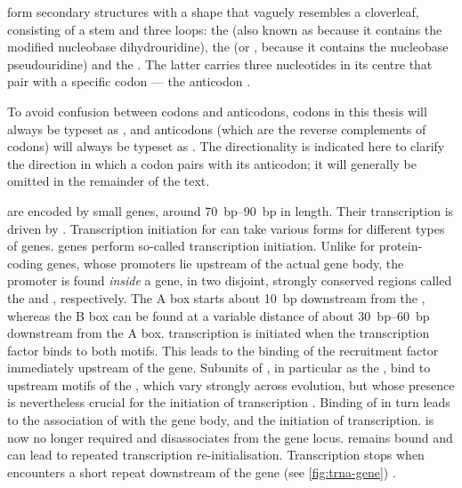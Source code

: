 \trna[s]
form secondary structures with a shape that vaguely resembles a
cloverleaf, consisting of a stem and three loops: the  (also
known as  because it contains the modified nucleobase
dihydrouridine), the  (or , because it contains
the nucleobase pseudouridine) and the . The latter
carries three nucleotides in its centre that pair with a specific codon --- the
anticodon \citep{Rich:1978,Schimmel:1979}.

To avoid confusion between codons and anticodons, codons in this thesis will
always be typeset as , and anticodons (which are the
reverse complements of codons) will always be typeset as
. The directionality is indicated here to clarify the
direction in which a codon pairs with its anticodon; it will generally be
omitted in the remainder of the text.


\trna[s] are encoded by small genes, around \SIrange{70}{90}{bp} in length.
Their transcription is driven by . Transcription initiation for  can
take various forms for different types of genes. \trna genes perform so-called
  transcription initiation. Unlike for
protein-coding genes, whose promoters lie upstream of the actual gene body, the
promoter is found \emph{inside} a \trna gene, in two disjoint, strongly
conserved regions called the  and , respectively.
The A box starts about \SI{10}{bp} downstream from the \tss, whereas the B box
can be found at a variable distance of about \SIrange{30}{60}{bp} downstream
from the A box. \trna transcription is initiated when the transcription factor
\tfiiic binds to both motifs. This leads to the binding of the  recruitment
factor \tfiiib immediately upstream of the \trna gene. Subunits of \tfiiib, in
particular as the \tbp, bind to upstream motifs of the \trna, which vary
strongly across evolution, but whose presence is nevertheless crucial for the
initiation of transcription \citep{Palida:1993,White:1992}. Binding of \tfiiib
in turn leads to the association of  with the gene body, and the initiation
of transcription. \tfiiic is now no longer required and disassociates from the
gene locus. \tfiiib remains bound and can lead to repeated transcription
re-initialisation. Transcription stops when  encounters a short \nT repeat
downstream of the \trna gene (see \cref{fig:trna-gene})
\citep{White:1998,Dieci:2007}.

